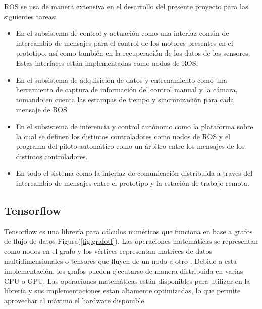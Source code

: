         ROS se usa de manera extensiva en el desarrollo del presente proyecto para las siguientes tareas:

        \begin{itemize}
            \item En el subsistema de control y actuación como una interfaz común de intercambio de mensajes para el control de los motores presentes en el prototipo, así como también en la recuperación de los datos de los sensores. Estas interfaces están implementadas como nodos de ROS.
            \item En el subsistema de adquisición de datos y entrenamiento como una herramienta de captura de información del control manual y la cámara, tomando en cuenta las estampas de tiempo y sincronización para cada mensaje de ROS.
            \item En el subsistema de inferencia y control autónomo como la plataforma sobre la cual se definen los distintos controladores como nodos de ROS y el programa del piloto automático como un árbitro entre los mensajes de los distintos controladores. 
            \item En todo el sistema como la interfaz de comunicación distribuida a través del intercambio de mensajes entre el prototipo y la estación de trabajo remota.
        \end{itemize}

    \subsection{Tensorflow}
    Tensorflow es una librería para cálculos numéricos que funciona en base a grafos de flujo de datos Figura(\ref{fig:grafotf}). Las operaciones matemáticas 
    se representan como nodos en el grafo y los vértices representan matrices de datos multidimensionales o tensores que fluyen de 
    un nodo a otro  \cite{tensorflow2015-whitepaper}. Debido a esta implementación, los grafos pueden ejecutarse de manera distribuida en varias CPU o GPU. Las operaciones 
    matemáticas están disponibles para utilizar en la librería y sus implementaciones estan altamente optimizadas, lo que permite 
    aprovechar al máximo el hardware disponible.

